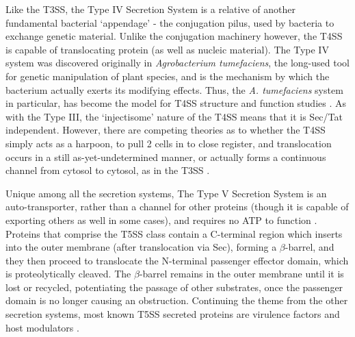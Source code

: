 Like the T3SS, the Type IV Secretion System is a relative of another fundamental bacterial `appendage' - the conjugation pilus, used by bacteria to exchange genetic material. Unlike the conjugation machinery however, the T4SS is capable of translocating protein (as well as nucleic material). The Type IV system was discovered originally in \emph{Agrobacterium tumefaciens}, the long-used tool for genetic manipulation of plant species, and is the mechanism by which the bacterium actually exerts its modifying effects. Thus, the \emph{A. tumefaciens} system in particular, has become the model for T4SS structure and function studies \citep{Bundock1995}. As with the Type III, the `injectisome' nature of the T4SS means that it is Sec/Tat independent. However, there are competing theories as to whether the T4SS simply acts as a harpoon, to pull 2 cells in to close register, and translocation occurs in a still as-yet-undetermined manner, or actually forms a continuous channel from cytosol to cytosol, as in the T3SS \citep{Christie2005, Green2015}.

Unique among all the secretion systems, The Type V Secretion System is an auto-transporter, rather than a channel for other proteins (though it is capable of exporting others as well in some cases), and requires no ATP to function \citep{Thanassi2005}. Proteins that comprise the T5SS class contain a C-terminal region which inserts into the outer membrane (after translocation via Sec), forming a $\beta$-barrel, and they then proceed to translocate the N-terminal passenger effector domain, which is proteolytically cleaved. The $\beta$-barrel remains in the outer membrane until it is lost or recycled, potentiating the passage of other substrates, once the passenger domain is no longer causing an obstruction. Continuing the theme from the other secretion systems, most known T5SS secreted proteins are virulence factors and host modulators \citep{Green2015}.

